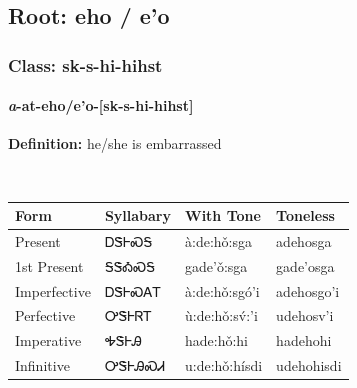 \needspace{4in}
\subsection*{Root: eho / e'o}
\nopagebreak
{}
\needspace{3in}
\subsubsection*{Class: sk-s-hi-hihst}
\nopagebreak
\needspace{2in}
\paragraph*{\textit{a}{-}at{-}\textbf{eho/e'o}{-}[sk-s-hi-hihst]}
\nopagebreak
\textbf{Definition: } he/she is embarrassed
\\[0.5em]
\begin{tabularx}{\textwidth}{l X X X}%
\toprule%
\textbf{Form}&\textbf{Syllabary}&\textbf{With Tone}&\textbf{Toneless}\\%
\midrule%
Present&ᎠᏕᎰᏍᎦ&à:de:hǒ:sga&adehosga\\%
1st Present&ᎦᏕᎣᏍᎦ&gade’ǒ:sga&gade’osga\\%
Imperfective&ᎠᏕᎰᏍᎪᎢ&à:de:hǒ:sgó’i&adehosgo’i\\%
Perfective&ᎤᏕᎰᏒᎢ&ù:de:hǒ:sv́:’i&udehosv’i\\%
Imperative&ᎭᏕᎰᎯ&hade:hǒ:hi&hadehohi\\%
Infinitive&ᎤᏕᎰᎯᏍᏗ&u:de:hǒ:hísdi&udehohisdi\\%
\bottomrule%
\end{tabularx}
\\[1em]